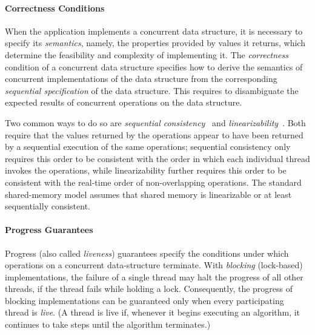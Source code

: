
\paragraph{Correctness Conditions}
When the application implements a concurrent data structure, it is necessary to specify its \emph{semantics}, namely, the properties provided by values it returns, which
determine the feasibility and complexity of implementing it. The \emph{correctness} condition of a concurrent data structure specifies how to derive the semantics of concurrent implementations of the data structure from the corresponding \emph{sequential specification} of the data structure.
This requires to disambiguate the expected results of concurrent operations on
the data structure.

Two common ways to do so are \emph{sequential consistency}~\cite{LamportSC}
and \emph{linearizability}~\cite{herlihyWingLinearizability}.
Both require that the values returned by the operations appear to have been returned by a sequential
execution of the same operations; sequential consistency only requires this order to be consistent with
the order in which each individual thread invokes the operations, while linearizability further requires
this order to be consistent with the real-time order of non-overlapping operations. The standard shared-memory model assumes that shared memory is linearizable or at least sequentially consistent.

\remove{%
}%

\paragraph{Progress Guarantees}
Progress (also called \emph{liveness}) guarantees specify the conditions under which operations on a concurrent data-structure terminate. With \emph{blocking} (lock-based) implementations, the failure of a single thread may halt the progress of all other threads, if the thread fails while holding a lock. Consequently, the progress of blocking implementations can be guaranteed only when every participating thread is \emph{live}. (A thread is live if, whenever it begins executing an algorithm, it continues to take steps until the algorithm terminates.)

